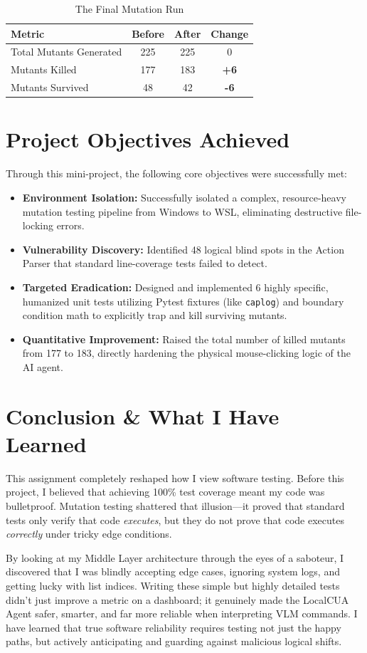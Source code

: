 \documentclass[a4paper,12pt]{article}
\begin{document}
\begin{table}[h!]
\centering
\caption{The Final Mutation Run}
\begin{tabular}{|l|c|c|c|}
\hline
\textbf{Metric} & \textbf{Before} & \textbf{After} & \textbf{Change} \\ \hline
Total Mutants Generated & 225 & 225 & 0 \\ \hline
Mutants Killed & 177 & 183 & \textbf{+6} \\ \hline
Mutants Survived & 48 & 42 & \textbf{-6} \\ \hline
\end{tabular}
\end{table}

\newpage
\section{Project Objectives Achieved}
Through this mini-project, the following core objectives were successfully met:
\begin{itemize}
    \item \textbf{Environment Isolation:} Successfully isolated a complex, resource-heavy mutation testing pipeline from Windows to WSL, eliminating destructive file-locking errors.
    \item \textbf{Vulnerability Discovery:} Identified 48 logical blind spots in the Action Parser that standard line-coverage tests failed to detect.
    \item \textbf{Targeted Eradication:} Designed and implemented 6 highly specific, humanized unit tests utilizing Pytest fixtures (like \verb|caplog|) and boundary condition math to explicitly trap and kill surviving mutants.
    \item \textbf{Quantitative Improvement:} Raised the total number of killed mutants from 177 to 183, directly hardening the physical mouse-clicking logic of the AI agent.
\end{itemize}

\section{Conclusion \& What I Have Learned}
This assignment completely reshaped how I view software testing. Before this project, I believed that achieving 100\% test coverage meant my code was bulletproof. Mutation testing shattered that illusion—it proved that standard tests only verify that code \textit{executes}, but they do not prove that code executes \textit{correctly} under tricky edge conditions. 

By looking at my Middle Layer architecture through the eyes of a saboteur, I discovered that I was blindly accepting edge cases, ignoring system logs, and getting lucky with list indices. Writing these simple but highly detailed tests didn't just improve a metric on a dashboard; it genuinely made the LocalCUA Agent safer, smarter, and far more reliable when interpreting VLM commands. I have learned that true software reliability requires testing not just the happy paths, but actively anticipating and guarding against malicious logical shifts.
\end{document}
